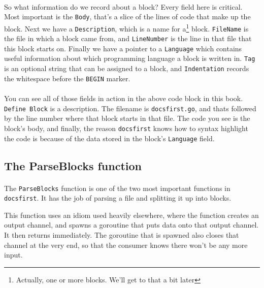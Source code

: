 \documentclass{article}
\begin{document}
\paragraph{}
So what information do we record about a block? Every field here is critical.
Most important is the \texttt{Body}, that's a slice of the lines of code that make
up the block. Next we have a \texttt{Description}, which is a name for
a\footnote{Actually, one or more blocks. We'll get to that a bit later} block.
\texttt{FileName} is the file in which a block came from, and \texttt{LineNumber}
is the line in that file that this block starts on. Finally we have a pointer to
a \texttt{Language} which contains useful information about which programming
language a block is written in. \texttt{Tag} is an optional string that can be
assigned to a block, and \texttt{Indentation} records the whitespace before the
\texttt{BEGIN} marker.

\paragraph{}
You can see all of those fields in action in the above code block in this book.
\texttt{Define Block} is a description. The filename is \texttt{docsfirst.go}, and
thats followed by the line number where that block starts in that file. The code
you see is the block's body, and finally, the reason \texttt{docsfirst} knows how
to syntax highlight the code is because of the data stored in the block's
\texttt{Language} field.

\subsection{The ParseBlocks function}

\paragraph{}
The \texttt{ParseBlocks} function is one of the two most important functions in
\texttt{docsfirst}. It has the job of parsing a file and splitting it up into
blocks.


This function uses an idiom used heavily elsewhere, where the function creates an
output channel, and spawns a goroutine that puts data onto that output channel.
It then returns immediately. The goroutine that is spawned also closes that
channel at the very end, so that the consumer knows there won't be any more
input.
\end{document}

